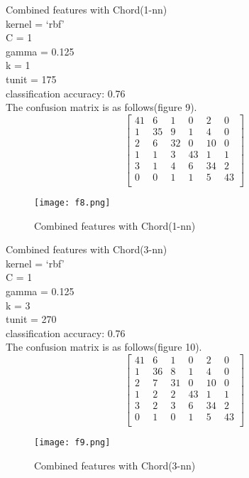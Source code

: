 \documentclass{article} %
\begin{document}
Combined features with Chord(1-nn) \\
kernel = ‘rbf’ \\
C = 1 \\
gamma = 0.125 \\ 
k = 1\\
tunit = 175 \\
classification accuracy:  0.76 \\
The confusion matrix is as follows(figure 9). \\
$$
\begin{bmatrix}

41&  6&   1&   0&   2 &  0\\
 1&  35&  9&   1&   4&   0\\
 2&   6&  32&  0 & 10&  0\\
 1&   1&   3&  43&  1&   1\\
 3&   1&   4&   6&  34&  2\\
 0&   0&   1&   1&   5& 43\\



\end{bmatrix}
$$
\begin{figure}[H]	
	\centering
	\texttt{[image: f8.png]}
	\caption{Combined features with Chord(1-nn)}
\end{figure}
Combined features with Chord(3-nn) \\
kernel = ‘rbf’ \\
C = 1 \\
gamma = 0.125 \\ 
k = 3\\
tunit = 270 \\
classification accuracy:  0.76 \\
The confusion matrix is as follows(figure 10). \\
$$
\begin{bmatrix}

41&  6&  1&  0&  2&  0\\
 1& 36&  8&  1&  4&  0\\
 2&  7& 31&  0& 10&  0\\
 1&  2&  2& 43&  1&  1\\
 3&  2&  3&  6& 34&  2\\
 0&  1&  0&  1&  5& 43\\

\end{bmatrix}
$$
\begin{figure}[H]	
	\centering
	\texttt{[image: f9.png]}
	\caption{Combined features with Chord(3-nn)}
\end{figure}
\end{document}
